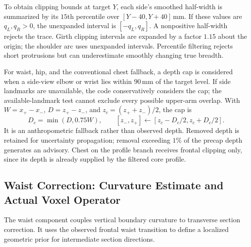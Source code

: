 \documentclass[11pt,a4paper]{article}
\numberwithin{equation}{section}
\begin{document}
To obtain clipping bounds at target $Y$, each side's smoothed half-width is summarized by its $15$th percentile over $[Y-40,Y+40]$\,mm. If these values are $q_L,q_R>0$, the unexpanded interval is $[-q_L,q_R]$. A nonpositive half-width rejects the trace. Girth clipping intervals are expanded by a factor $1.15$ about the origin; the shoulder arc uses unexpanded intervals. Percentile filtering rejects short protrusions but can underestimate smoothly changing true breadth.

For waist, hip, and the conventional chest fallback, a depth cap is considered when a side-view elbow or wrist lies within $90$\,mm of the target level. If side landmarks are unavailable, the code conservatively considers the cap; the available-landmark test cannot exclude every possible upper-arm overlap. With $W=x_+-x_-$, $D=z_+-z_-$, and $z_c=(z_++z_-)/2$, the cap is
\begin{equation}
D_c=\min(D,0.75W),\qquad [z_-,z_+]\leftarrow[z_c-D_c/2,z_c+D_c/2].
\end{equation}
It is an anthropometric fallback rather than observed depth. Removed depth is retained for uncertainty propagation; removal exceeding $1\%$ of the precap depth generates an advisory. Chest on the profile branch receives frontal clipping only, since its depth is already supplied by the filtered core profile.

\subsection{Waist Correction: Curvature Estimate and Actual Voxel Operator}
\label{subsec:waist_correction}
The waist component couples vertical boundary curvature to transverse section correction. It uses the observed frontal waist transition to define a localized geometric prior for intermediate section directions.
\end{document}

